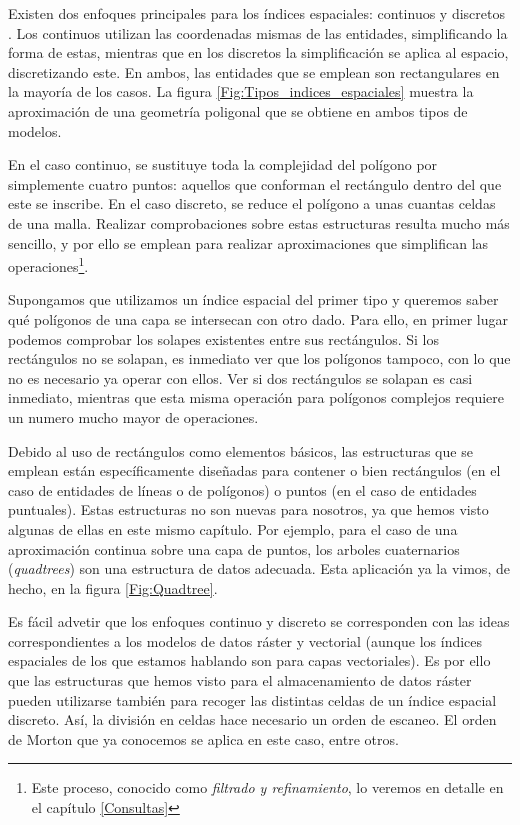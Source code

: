 \begin{multicols}{2}
Existen dos enfoques principales para los índices espaciales: continuos y discretos \cite{Guting1994VLDB}. Los continuos utilizan las coordenadas mismas de las entidades, simplificando la forma de estas, mientras que en los discretos la simplificación se aplica al espacio, discretizando este. En ambos, las entidades que se emplean son rectangulares en la mayoría de los casos. La figura \ref{Fig:Tipos_indices_espaciales} muestra la aproximación de una geometría poligonal que se obtiene en ambos tipos de modelos. 


En el caso continuo, se sustituye toda la complejidad del polígono por simplemente cuatro puntos: aquellos que conforman el rectángulo dentro del que este se inscribe. En el caso discreto, se reduce el polígono a unas cuantas celdas de una malla. Realizar comprobaciones sobre estas estructuras resulta mucho más sencillo, y por ello se emplean para realizar aproximaciones que simplifican las operaciones\footnote{Este proceso, conocido como \emph{filtrado y refinamiento}, lo veremos en detalle en el capítulo \ref{Consultas}}.

Supongamos que utilizamos un índice espacial del primer tipo y queremos saber qué polígonos de una capa se intersecan con otro dado. Para ello, en primer lugar podemos comprobar los solapes existentes entre sus rectángulos. Si los rectángulos no se solapan, es inmediato ver que los polígonos tampoco, con lo que no es necesario ya operar con ellos. Ver si dos rectángulos se solapan es casi inmediato, mientras que esta misma operación para polígonos complejos requiere un numero mucho mayor de operaciones.

Debido al uso de rectángulos como elementos básicos, las estructuras que se emplean están específicamente diseñadas para contener o bien rectángulos (en el caso de entidades de líneas o de polígonos) o puntos (en el caso de entidades puntuales). Estas estructuras no son nuevas para nosotros, ya que hemos visto algunas de ellas en este mismo capítulo. Por ejemplo, para el caso de una aproximación continua sobre una capa de puntos, los arboles cuaternarios (\emph{quadtrees}) son una estructura de datos adecuada. Esta aplicación ya la vimos, de hecho, en la figura \ref{Fig:Quadtree}.

Es fácil advetir que los enfoques continuo y discreto se corresponden con las ideas correspondientes a los modelos de datos ráster y vectorial (aunque los índices espaciales de los que estamos hablando son para capas vectoriales). Es por ello que las estructuras que hemos visto para el almacenamiento de datos ráster pueden utilizarse también para recoger las distintas celdas de un índice espacial discreto. Así, la división en celdas hace necesario un orden de escaneo. El orden de Morton que ya conocemos se aplica en este caso, entre otros.


\end{multicols}
